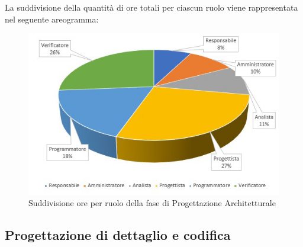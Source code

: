 La suddivisione della quantità di ore totali per ciascun ruolo viene rappresentata nel seguente areogramma:

\begin{figure}[h]
	\centering
	
	
	\includegraphics[scale=1.9]{Sezioni/Aerogrammi/AerogrammaProgettArchitetturale.png}
	\caption{Suddivisione ore per ruolo della fase di Progettazione Architetturale}
\end{figure}

\clearpage
\subsection{Progettazione di dettaglio e codifica}

